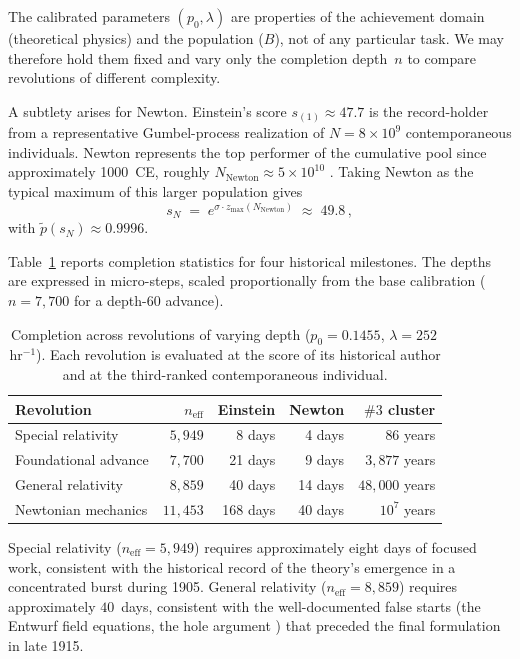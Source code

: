 \documentclass{article}
\begin{document}
The calibrated parameters $(p_0, \lambda)$ are properties of the
achievement domain (theoretical physics) and the population ($B$), not of
any particular task. We may therefore hold them fixed and vary only the
completion depth~$n$ to compare revolutions of different complexity.

A subtlety arises for Newton. Einstein's score $s_{(1)} \approx 47.7$
is the record-holder from a representative Gumbel-process realization of
$N = 8 \times 10^9$ contemporaneous individuals. Newton represents the
top performer of the cumulative pool since approximately 1000~CE,
roughly $N_{\mathrm{Newton}} \approx 5 \times 10^{10}$
\cite{haub2022howmany}. Taking Newton as the typical maximum of this larger population gives
\begin{equation}\label{eq:newton-score}
  s_N
  \;=\;
  e^{\sigma \cdot z_{\max}(N_{\mathrm{Newton}})}
  \;\approx\; 49.8\,,
\end{equation}
with $\widetilde{p}(s_N) \approx 0.9996$.

Table~\ref{tab:revolutions-summary} reports completion statistics for four
historical milestones. The depths are expressed in micro-steps, scaled
proportionally from the base calibration ($n = 7{,}700$ for a
depth-$60$ advance).

\begin{table}[ht]
  \centering
  \caption{Completion across revolutions of varying depth
           ($p_0 = 0.1455$, $\lambda = 252\,$hr$^{-1}$). Each revolution
           is evaluated at the score of its historical author and at the
           third-ranked contemporaneous individual.}
  \label{tab:revolutions-summary}
  \medskip
  \begin{tabular}{l r r r r}
    \hline
    Revolution & $n_{\mathrm{eff}}$ &
    Einstein & Newton & $\#3$ cluster \\
    \hline
    Special relativity   & $5{,}949$  &    8 days &    4 days &    86 years \\
    Foundational advance & $7{,}700$  &   21 days &    9 days & $3{,}877$ years \\
    General relativity   & $8{,}859$  &   40 days &   14 days & $48{,}000$ years \\
    Newtonian mechanics  & $11{,}453$ &  168 days &   40 days & $10^{7}$ years \\
    \hline
  \end{tabular}
\end{table}

Special relativity ($n_{\mathrm{eff}} = 5{,}949$) requires
approximately eight days of focused work,
consistent with the historical record of the theory's emergence
in a concentrated burst during 1905. General relativity
($n_{\mathrm{eff}} = 8{,}859$) requires approximately $40$~days,
consistent with the well-documented false starts (the Entwurf field
equations, the hole argument \cite{pais1982subtle}) that preceded the
final formulation in late 1915.
\end{document}
